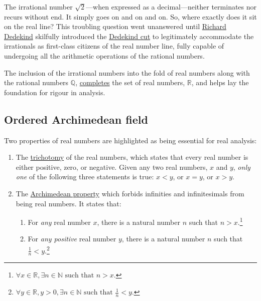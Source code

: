 \documentclass[
  a4paper,
]{article}
\providecommand{\tightlist}{%
  \setlength{\itemsep}{0pt}\setlength{\parskip}{0pt}}
\begin{document}
The irrational number \(\sqrt{2}\)---when expressed as a
decimal---neither terminates nor recurs without end. It simply goes on
and on and on. So, where exactly does it sit on the real line? This
troubling question went unanswered until
\href{https://plato.stanford.edu/entries/dedekind-foundations/}{Richard
Dedekind} skilfully introduced the
\href{https://www.britannica.com/science/Dedekind-cut}{Dedekind cut} to
legitimately accommodate the irrationals as first-class citizens of the
real number line, fully capable of undergoing all the arithmetic
operations of the rational numbers.

The inclusion of the irrational numbers into the fold of real numbers
along with the rational numbers \(\mathbb{Q}\),
\href{https://en.wikipedia.org/wiki/Completeness_of_the_real_numbers}{completes}
the set of real numbers, \(\mathbb{R}\), and helps lay the foundation
for rigour in analysis.

\subsection{Ordered Archimedean field}\label{ordered-archimedean-field}

Two properties of real numbers are highlighted as being essential for
real analysis:

\begin{enumerate}
\def\labelenumi{\alph{enumi}.}
\item
  The \href{https://en.wikipedia.org/wiki/Law_of_trichotomy}{trichotomy}
  of the real numbers, which states that every real number is either
  positive, zero, or negative. Given any two real numbers, \(x\) and
  \(y\), \emph{only one} of the following three statements is true:
  \(x < y\), or \(x = y\), or \(x > y\).
\item
  The \href{https://planetmath.org/archimedeanproperty}{Archimedean
  property} which forbids infinities and infinitesimals from being real
  numbers. It states that:

  \begin{enumerate}
  \def\labelenumii{(\roman{enumii})}
  \tightlist
  \item
    For \emph{any} real number \(x\), there is a natural number \(n\)
    such that \(n > x\).\footnote{\(\forall x \in \mathbb{R}, \exists n \in \mathbb{N} \text{ such that } n > x.\)}
  \item
    For \emph{any positive} real number \(y\), there is a natural number
    \(n\) such that \(\frac{1}{n} < y\).\footnote{\(\forall y \in \mathbb{R}, y > 0, \exists n \in \mathbb{N} \text{ such that } \frac{1}{n} < y\).}
  \end{enumerate}
\end{enumerate}
\end{document}
